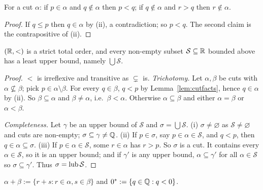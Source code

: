 \begin{lemma}\label{lem:cutfacts}
	For a cut $\alpha$: if $p\in\alpha$ and $q\notin\alpha$ then $p<q$; if $q\notin\alpha$ and $r>q$ then $r\notin\alpha$.
\end{lemma}
\begin{proof}
	If $q\le p$ then $q\in\alpha$ by (ii), a contradiction; so $p<q$. The second claim is the contrapositive of (ii).
\end{proof}

\begin{theorem}\label{thm:cuts-lub}
	$(\mathbb{R},<)$ is a strict total order, and every non-empty subset $\mathcal S\subseteq\mathbb{R}$ bounded above has a least upper bound, namely $\bigcup\mathcal S$.
\end{theorem}
\begin{proof}
	$<$ is irreflexive and transitive as $\subsetneq$ is. \emph{Trichotomy.} Let $\alpha,\beta$ be cuts with $\alpha\not\subseteq\beta$; pick $p\in\alpha\setminus\beta$. For every $q\in\beta$, $q<p$ by Lemma~\ref{lem:cutfacts}, hence $q\in\alpha$ by (ii). So $\beta\subseteq\alpha$ and $\beta\ne\alpha$, i.e.\ $\beta<\alpha$. Otherwise $\alpha\subseteq\beta$ and either $\alpha=\beta$ or $\alpha<\beta$.
	
	\emph{Completeness.} Let $\gamma$ be an upper bound of $\mathcal S$ and $\sigma=\bigcup\mathcal S$. (i) $\sigma\ne\varnothing$ as $\mathcal S\ne\varnothing$ and cuts are non-empty; $\sigma\subseteq\gamma\neq\mathbb{Q}$. (ii) If $p\in\sigma$, say $p\in\alpha\in\mathcal S$, and $q<p$, then $q\in\alpha\subseteq\sigma$. (iii) If $p\in\alpha\in\mathcal S$, some $r\in\alpha$ has $r>p$. So $\sigma$ is a cut. It contains every $\alpha\in\mathcal S$, so it is an upper bound; and if $\gamma'$ is any upper bound, $\alpha\subseteq\gamma'$ for all $\alpha\in\mathcal S$ so $\sigma\subseteq\gamma'$. Thus $\sigma=\operatorname{lub}\mathcal S$.
\end{proof}

\begin{definition}
	$\alpha+\beta:=\{r+s:r\in\alpha,s\in\beta\}$ and $0^*:=\{q\in\mathbb{Q}:q<0\}$.
\end{definition}


